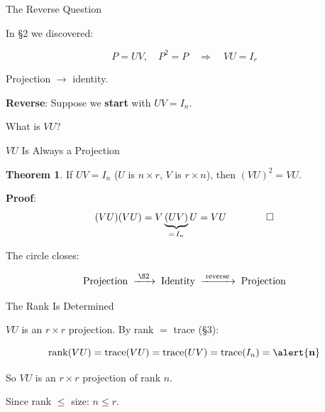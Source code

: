 \documentclass[10pt]{beamer}
\theoremstyle{definition}
\newtheorem{thm}{Theorem}[section]
\newcommand{\x}[1]{\alert{\textbf{#1}}}
\begin{document}
\begin{frame}{The Reverse Question}

In \S2 we discovered:

$$P = UV, \quad P^2 = P \quad\Longrightarrow\quad VU = I_r$$

Projection $\longrightarrow$ identity.

\vspace{0.5em}

\x{Reverse}: Suppose we \x{start} with $UV = I_n$.

\vspace{0.3em}

What is $VU$?

\end{frame}

\begin{frame}{$VU$ Is Always a Projection}

\begin{thm}
If $UV = I_n$ ($U$ is $n \times r$, $V$ is $r \times n$), then $(VU)^2 = VU$.
\end{thm}

\vspace{0.3em}

\textbf{Proof}:
$$(VU)(VU) = V\underbrace{(UV)}_{=\, I_n}U = VU \qquad\qed$$

\vspace{0.5em}

The circle closes:

$$\text{Projection} \;\xrightarrow{\;\text{\S2}\;}\; \text{Identity} \;\xrightarrow{\;\text{reverse}\;}\; \text{Projection}$$

\end{frame}

\begin{frame}{The Rank Is Determined}

$VU$ is an $r \times r$ projection. By rank $=$ trace (\S3):

$$\operatorname{rank}(VU) = \operatorname{trace}(VU) = \operatorname{trace}(UV) = \operatorname{trace}(I_n) = \x{n}$$

\vspace{0.5em}

So $VU$ is an $r \times r$ projection of rank $n$.

\vspace{0.3em}

Since rank $\leq$ size: \quad $n \leq r$.

\end{frame}
\end{document}
